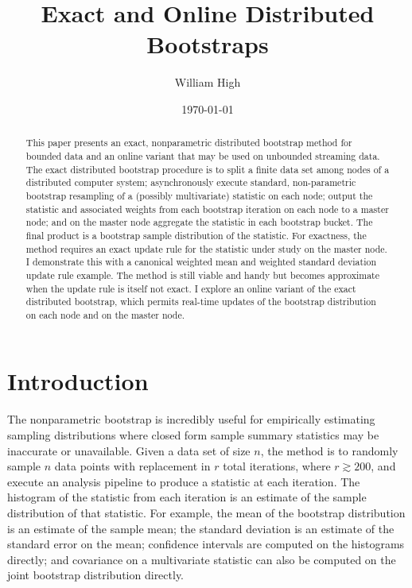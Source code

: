 \documentclass{article}
\begin{document}
%

\title{Exact and Online Distributed Bootstraps}
\author{William High}
\date{\today}
\maketitle

\begin{abstract}

This paper presents an exact, nonparametric distributed bootstrap method for
bounded data and an online variant that may be used on unbounded streaming
data. The exact distributed bootstrap procedure is to split a finite data set
among nodes of a distributed computer system; asynchronously execute standard,
non-parametric bootstrap resampling of a (possibly multivariate) statistic on
each node; output the statistic and associated weights from each bootstrap
iteration on each node to a master node; and on the master node aggregate the
statistic in each bootstrap bucket. The final product is a bootstrap sample
distribution of the statistic. For exactness, the method requires an exact
update rule for the statistic under study on the master node. I demonstrate
this with a canonical weighted mean and weighted standard deviation update
rule example. The method is still viable and handy but becomes approximate
when the update rule is itself not exact.  I explore an online variant of the
exact distributed bootstrap, which permits real-time updates of the bootstrap
distribution on each node and on the master node.

\end{abstract}

\section{Introduction}

The nonparametric bootstrap \cite{bib:efron} is incredibly useful for
empirically estimating sampling distributions where closed form sample summary
statistics may be inaccurate or unavailable.  Given a data set of size $n$,
the method is to randomly sample $n$ data points with replacement in $r$ total
iterations, where $r \gtrsim 200$, and execute an analysis pipeline to produce
a statistic at each iteration. The histogram of the statistic from each
iteration is an estimate of the sample distribution of that statistic. For
example, the mean of the bootstrap distribution is an estimate of the sample
mean; the standard deviation is an estimate of the standard error on the mean;
confidence intervals are computed on the histograms directly; and covariance
on a multivariate statistic can also be computed on the joint bootstrap
distribution directly.
\end{document}
